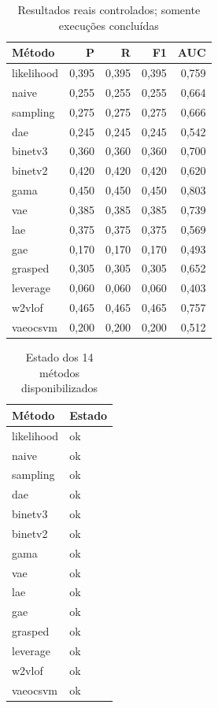 \documentclass[conference]{IEEEtran}
\begin{document}
\begin{table}[t]\centering\caption{Resultados reais controlados; somente execuções concluídas}\begin{tabular}{lrrrr}\toprule
Método & P & R & F1 & AUC\\\midrule
likelihood & 0,395 & 0,395 & 0,395 & 0,759 \\
naive & 0,255 & 0,255 & 0,255 & 0,664 \\
sampling & 0,275 & 0,275 & 0,275 & 0,666 \\
dae & 0,245 & 0,245 & 0,245 & 0,542 \\
binetv3 & 0,360 & 0,360 & 0,360 & 0,700 \\
binetv2 & 0,420 & 0,420 & 0,420 & 0,620 \\
gama & 0,450 & 0,450 & 0,450 & 0,803 \\
vae & 0,385 & 0,385 & 0,385 & 0,739 \\
lae & 0,375 & 0,375 & 0,375 & 0,569 \\
gae & 0,170 & 0,170 & 0,170 & 0,493 \\
grasped & 0,305 & 0,305 & 0,305 & 0,652 \\
leverage & 0,060 & 0,060 & 0,060 & 0,403 \\
w2vlof & 0,465 & 0,465 & 0,465 & 0,757 \\
vaeocsvm & 0,200 & 0,200 & 0,200 & 0,512 \\
\bottomrule\end{tabular}\end{table}

\begin{table}[t]\centering\caption{Estado dos 14 métodos disponibilizados}\begin{tabular}{ll}\toprule
Método & Estado\\\midrule
likelihood & ok \\
naive & ok \\
sampling & ok \\
dae & ok \\
binetv3 & ok \\
binetv2 & ok \\
gama & ok \\
vae & ok \\
lae & ok \\
gae & ok \\
grasped & ok \\
leverage & ok \\
w2vlof & ok \\
vaeocsvm & ok \\
\bottomrule\end{tabular}\end{table}
\end{document}
